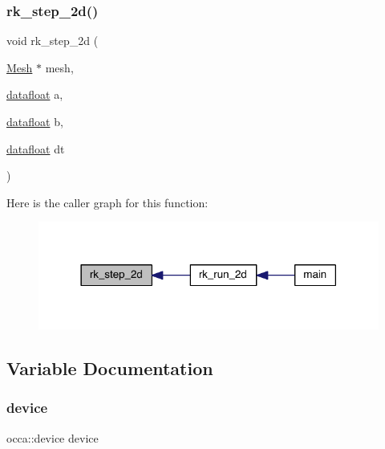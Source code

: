 \subsubsection{\texorpdfstring{rk\+\_\+step\+\_\+2d()}{rk\_step\_2d()}}
{\footnotesize\ttfamily void rk\+\_\+step\+\_\+2d (\begin{DoxyParamCaption}\item[{\hyperlink{a00557_aeffbe0891ab73a4d8964c9cb7978426e}{Mesh} $\ast$}]{mesh,  }\item[{\hyperlink{a00557_aa484d27c864c1a224505d8a302c0a4a4}{datafloat}}]{a,  }\item[{\hyperlink{a00557_aa484d27c864c1a224505d8a302c0a4a4}{datafloat}}]{b,  }\item[{\hyperlink{a00557_aa484d27c864c1a224505d8a302c0a4a4}{datafloat}}]{dt }\end{DoxyParamCaption})}

Here is the caller graph for this function\+:\nopagebreak
\begin{figure}[H]
\begin{center}
\leavevmode
\includegraphics[width=318pt]{a00584_a9b253cfe04029e084b403542b0d7a64b_icgraph}
\end{center}
\end{figure}


\subsection{Variable Documentation}
\mbox{\label{a00584_a66c14c55458e7125832150ab8c8550b2}} 
\subsubsection{\texorpdfstring{device}{device}}
{\footnotesize\ttfamily occa\+::device device}

\mbox{\label{a00584_a3b234d10fa55cd79b2978baf108ca7fd}} 
